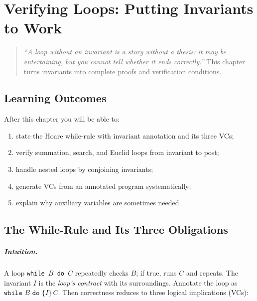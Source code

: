 \chapter{Verifying Loops: Putting Invariants to Work}
\label{ch:loop-verify}

\begin{quote}
\emph{``A loop without an invariant is a story without a thesis: it may be entertaining, but you cannot tell whether it ends correctly.''} This chapter turns invariants into complete proofs and verification conditions.
\end{quote}

\noindent{}
\vspace{0.4em}

\section*{Learning Outcomes}
After this chapter you will be able to:
\begin{enumerate}[label=(L\arabic*)]
    \item state the Hoare while-rule with invariant annotation and its three VCs;
    \item verify summation, search, and Euclid loops from invariant to post;
    \item handle nested loops by conjoining invariants;
    \item generate VCs from an annotated program systematically;
    \item explain why auxiliary variables are sometimes needed.
\end{enumerate}

\section{The While-Rule and Its Three Obligations}
\label{sec:while-rule}
\paragraph{Intuition.} A loop \texttt{while $B$ do $C$} repeatedly checks $B$; if true, runs $C$ and repeats. The invariant $I$ is the \emph{loop's contract} with its surroundings. Annotate the loop as $\texttt{while }B\texttt{ do }\{I\}\,C$. Then correctness reduces to three logical implications (VCs):

